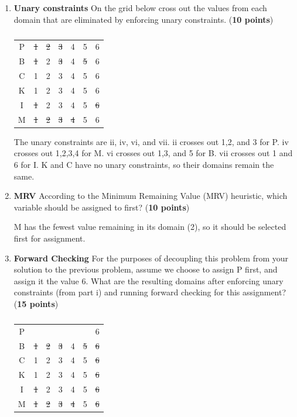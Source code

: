 \begin{enumerate}
  \item {\bf Unary constraints} On the grid below cross out the values from each domain that are eliminated by enforcing unary constraints. (\textbf{10 points})

  \begin{table}[h]
\centering
\caption{}
\begin{tabular}{ccccccc}
P & {\color{red}\sout{1}} & {\color{red}\sout{2} }& {\color{red}\sout{3}} & 4 & 5 & 6\\
B & {\color{red}\sout{1} }& 2 & {\color{red}\sout{3}} & 4 & {\color{red}\sout{5}} & 6\\
C & 1 & 2 & 3 & 4 & 5 & 6\\
K & 1 & 2 & 3 & 4 & 5 & 6\\
I & {\color{red}\sout{1}} & 2 & 3 & 4 & 5 & {\color{red}\sout{6}}\\
M & {\color{red}\sout{1}} & {\color{red}\sout{2}} & {\color{red}\sout{3}} & {\color{red}\sout{4}} & 5 & 6\\
\end{tabular}
\end{table}

{\color{red} The unary constraints are ii, iv, vi, and vii. ii crosses out 1,2, and 3 for P. iv crosses out 1,2,3,4 for M. vi crosses out 1,3, and 5 for B. vii crosses out 1 and 6 for I. K and C have no unary constraints, so their domains remain the same.}


\item {\bf MRV}
According to the Minimum Remaining Value (MRV) heuristic, which variable should be assigned to first? (\textbf{10 points})

{\color{red} M has the fewest value remaining in its domain (2), so it should be selected first for assignment.
}
\newpage

\item {\bf Forward Checking}
For the purposes of decoupling this problem from your solution to the
previous problem, assume we choose to assign P first, and assign it the value 6. What are the resulting domains after enforcing unary constraints (from part i) and running forward checking for this assignment? (\textbf{15 points})

\begin{table}[h]
\centering
\caption{}
\begin{tabular}{ccccccc}
P &   &   &   &  &   &  6\\
B & {\color{red}\sout{1}} & {\color{red}\sout{2}} & {\color{red}\sout{3}} & 4 & {\color{red}\sout{5}} & {\color{red}\sout{6}}\\
C & 1 & 2 & 3 & 4 & 5 & {\color{red}\sout{6}}\\
K & 1 & 2 & 3 & 4 & 5 & {\color{red}\sout{6}}\\
I & {\color{red}\sout{1}} & 2 & 3 & 4 & 5 & {\color{red}\sout{6}}\\
M & {\color{red}\sout{1}} &{\color{red} \sout{2}} & {\color{red}\sout{3}} & {\color{red}\sout{4}} & 5 & {\color{red}\sout{6}}\\
\end{tabular}
\end{table}


\end{enumerate}
